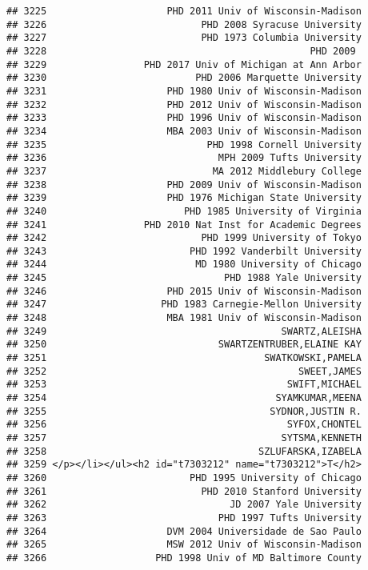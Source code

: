 \documentclass[
]{article}
\begin{document}
\begin{verbatim}
## 3225                     PHD 2011 Univ of Wisconsin-Madison
## 3226                           PHD 2008 Syracuse University
## 3227                           PHD 1973 Columbia University
## 3228                                              PHD 2009 
## 3229                 PHD 2017 Univ of Michigan at Ann Arbor
## 3230                          PHD 2006 Marquette University
## 3231                     PHD 1980 Univ of Wisconsin-Madison
## 3232                     PHD 2012 Univ of Wisconsin-Madison
## 3233                     PHD 1996 Univ of Wisconsin-Madison
## 3234                     MBA 2003 Univ of Wisconsin-Madison
## 3235                            PHD 1998 Cornell University
## 3236                              MPH 2009 Tufts University
## 3237                             MA 2012 Middlebury College
## 3238                     PHD 2009 Univ of Wisconsin-Madison
## 3239                     PHD 1976 Michigan State University
## 3240                        PHD 1985 University of Virginia
## 3241                 PHD 2010 Nat Inst for Academic Degrees
## 3242                           PHD 1999 University of Tokyo
## 3243                         PHD 1992 Vanderbilt University
## 3244                          MD 1980 University of Chicago
## 3245                               PHD 1988 Yale University
## 3246                     PHD 2015 Univ of Wisconsin-Madison
## 3247                    PHD 1983 Carnegie-Mellon University
## 3248                     MBA 1981 Univ of Wisconsin-Madison
## 3249                                         SWARTZ,ALEISHA
## 3250                              SWARTZENTRUBER,ELAINE KAY
## 3251                                      SWATKOWSKI,PAMELA
## 3252                                            SWEET,JAMES
## 3253                                          SWIFT,MICHAEL
## 3254                                        SYAMKUMAR,MEENA
## 3255                                       SYDNOR,JUSTIN R.
## 3256                                          SYFOX,CHONTEL
## 3257                                         SYTSMA,KENNETH
## 3258                                     SZLUFARSKA,IZABELA
## 3259 </p></li></ul><h2 id="t7303212" name="t7303212">T</h2>
## 3260                         PHD 1995 University of Chicago
## 3261                           PHD 2010 Stanford University
## 3262                                JD 2007 Yale University
## 3263                              PHD 1997 Tufts University
## 3264                     DVM 2004 Universidade de Sao Paulo
## 3265                     MSW 2012 Univ of Wisconsin-Madison
## 3266                   PHD 1998 Univ of MD Baltimore County

\end{verbatim}
\end{document}
